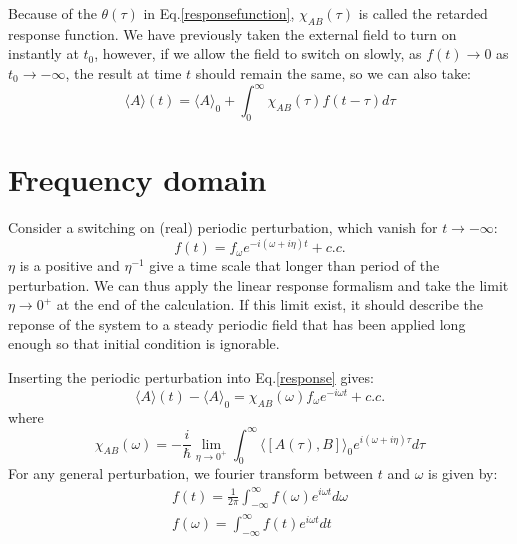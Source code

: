 \documentclass{article}
\begin{document}
Because of the $\theta(\tau)$ in Eq.\ref{responsefunction}, $\chi_{AB}(\tau)$ is called the retarded response function.
We have previously taken the external field to turn on instantly at $t_0$, however, if we allow the field to switch on
slowly, as $f(t) \to 0$ as $t_0 \to -\infty$, the result at time $t$ should remain the same, so we 
can also take:
\begin{equation}
    \langle A\rangle(t) = \langle A\rangle_0 + \int_{0}^{\infty} \chi_{AB}(\tau) f(t - \tau) d\tau \label{response}
\end{equation} 

\section{Frequency domain}
Consider a switching on (real) periodic perturbation, which vanish for $t \to -\infty$:
\begin{equation}
    f(t) = f_{\omega}e^{-i(\omega + i\eta) t} + c.c.
\end{equation}
$\eta$ is a positive and $\eta^{-1}$ give a time scale that longer than period of the perturbation.
We can thus apply the linear response formalism and take the limit $\eta \to 0^+$ at the 
end of the calculation. If this limit exist, it should describe the reponse of the 
system to a steady periodic field that has been applied long enough so that initial 
condition is ignorable.

Inserting the periodic perturbation into Eq.\ref{response} gives:
\begin{equation}
    \langle A\rangle(t) - \langle A\rangle_0 = \chi_{AB}(\omega) f_{\omega} e^{-i\omega t} + c.c.
\end{equation}
where 
\begin{equation}
    \chi_{AB}(\omega) = -\frac{i}{\hbar} \lim_{\eta\to 0^+} \int_{0}^{\infty} \langle [ A(\tau), B ] \rangle_0 e^{i(\omega+i\eta)\tau} d\tau
\end{equation}
For any general perturbation, we fourier transform between $t$ and $\omega$ is given by:
\begin{gather}
    f(t) = \frac{1}{2\pi} \int_{-\infty}^{\infty} f(\omega) e^{i\omega t} d\omega \\
    f(\omega) = \int_{-\infty}^{\infty} f(t) e^{i\omega t} dt
\end{gather}
\end{document}

